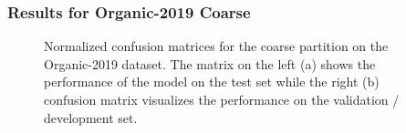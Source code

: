 \subsubsection*{Results for Organic-2019 Coarse}

\begin{figure}[htb]
	\centering
	
	\caption{Normalized confusion matrices for the coarse partition on the Organic-2019 dataset. The matrix on the left {(a)} shows the performance of the model on the test set while the right {(b)} confusion matrix visualizes the performance on the validation / development set.}
	\label{fig:06_ORG_coarse_cmatrices}
\end{figure}

